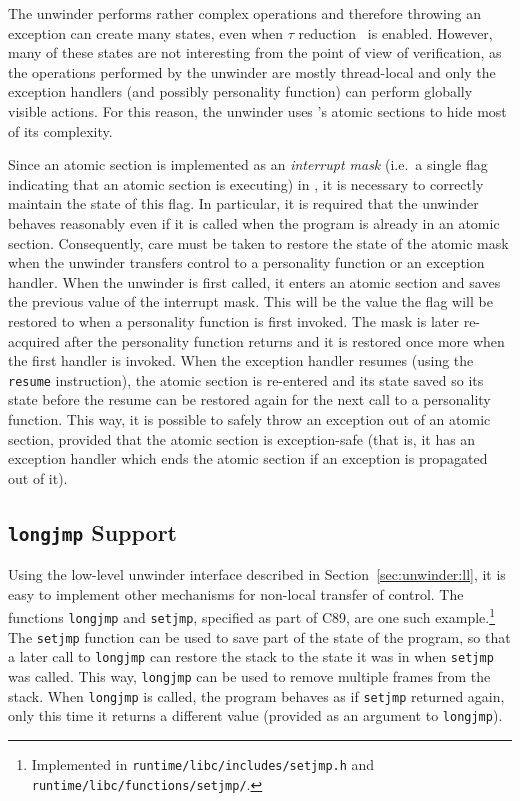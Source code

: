 The unwinder performs rather complex operations and therefore throwing
an exception can create many states, even when $\tau$
reduction~\cite{rockai13:improv.state} is enabled. However, many of
these states are not interesting from the point of view of verification,
as the operations performed by the unwinder are mostly thread-local and
only the exception handlers (and possibly personality function) can
perform globally visible actions. For this reason, the unwinder uses
\divm{}'s atomic sections to hide most of its complexity.

Since an atomic section is implemented as an \emph{interrupt mask}
(i.e.~a single flag indicating that an atomic section is executing) in
\divm{}, it is necessary to correctly maintain the state of this flag. In
particular, it is required that the unwinder behaves reasonably even if
it is called when the program is already in an atomic section.
Consequently, care must be taken to restore the state of the atomic mask
when the unwinder transfers control to a personality function or an
exception handler. When the unwinder is first called, it enters an
atomic section and saves the previous value of the interrupt mask. This
will be the value the flag will be restored to when a personality
function is first invoked. The mask is later re-acquired after the
personality function returns and it is restored once more when the first
handler is invoked. When the exception handler resumes (using the
\texttt{resume} instruction), the atomic section is re-entered and its
state saved so its state before the resume can be restored again for the
next call to a personality function. This way, it is possible to safely
throw an exception out of an atomic section, provided that the atomic
section is exception-safe (that is, it has an exception handler which
ends the atomic section if an exception is propagated out of it).

\subsection{\texorpdfstring{\texttt{longjmp}
Support}{longjmp Support}}\label{longjmp-support}

Using the low-level unwinder interface described in
Section~\ref{sec:unwinder:ll}, it is easy to implement other mechanisms
for non-local transfer of control. The functions \texttt{longjmp} and
\texttt{setjmp}, specified as part of C89, are one such
example.\footnote{Implemented in \texttt{runtime/libc/includes/setjmp.h}
  and \texttt{runtime/libc/functions/setjmp/}.} The \texttt{setjmp}
function can be used to save part of the state of the program, so that a
later call to \texttt{longjmp} can restore the stack to the state it was
in when \texttt{setjmp} was called. This way, \texttt{longjmp} can be
used to remove multiple frames from the stack. When \texttt{longjmp} is
called, the program behaves as if \texttt{setjmp} returned again, only
this time it returns a different value (provided as an argument to
\texttt{longjmp}).

